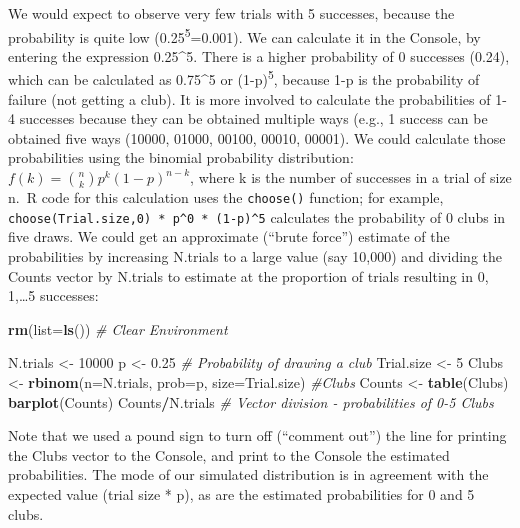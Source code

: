 \documentclass[
]{krantz}
\makeatletter
\newenvironment{Shaded}{\begin{snugshade}}{\end{snugshade}}
\newcommand{\AttributeTok}[1]{\textcolor[rgb]{0.27,0.27,0.27}{#1}}
\newcommand{\CommentTok}[1]{\textcolor[rgb]{0.37,0.37,0.37}{\textit{#1}}}
\newcommand{\DecValTok}[1]{\textcolor[rgb]{0.06,0.06,0.06}{#1}}
\newcommand{\FloatTok}[1]{\textcolor[rgb]{0.06,0.06,0.06}{#1}}
\newcommand{\FunctionTok}[1]{\textcolor[rgb]{0.27,0.27,0.27}{\textbf{#1}}}
\newcommand{\NormalTok}[1]{#1}
\newcommand{\OtherTok}[1]{\textcolor[rgb]{0.37,0.37,0.37}{#1}}
\newcommand{\SpecialCharTok}[1]{\textcolor[rgb]{0.43,0.43,0.43}{\textbf{#1}}}
\newenvironment{kframe}{%
\medskip{}
\setlength{\fboxsep}{.8em}
 \def\at@end@of@kframe{}%
 \ifinner\ifhmode%
  \def\at@end@of@kframe{\end{minipage}}%
  \begin{minipage}{\columnwidth}%
 \fi\fi%
 \def\FrameCommand##1{\hskip\@totalleftmargin \hskip-\fboxsep
 \colorbox{shadecolor}{##1}\hskip-\fboxsep
     \hskip-\linewidth \hskip-\@totalleftmargin \hskip\columnwidth}%
 \MakeFramed {\advance\hsize-\width
   \@totalleftmargin\z@ \linewidth\hsize
   \@setminipage}}%
 {\par\unskip\endMakeFramed%
 \at@end@of@kframe}
\renewenvironment{Shaded}{\begin{kframe}}{\end{kframe}}
\makeatother
\begin{document}
We would expect to observe very few trials with 5 successes, because the probability is quite low (0.25\textsuperscript{5}=0.001). We can calculate it in the Console, by entering the expression 0.25\^{}5. There is a higher probability of 0 successes (0.24), which can be calculated as 0.75\^{}5 or (1-p)\textsuperscript{5}, because 1-p is the probability of failure (not getting a club). It is more involved to calculate the probabilities of 1-4 successes because they can be obtained multiple ways (e.g., 1 success can be obtained five ways (10000, 01000, 00100, 00010, 00001). We could calculate those probabilities using the binomial probability distribution: \(f(k) = {n \choose k} p^{k} (1-p)^{n-k}\), where k is the number of successes in a trial of size n.~R code for this calculation uses the \texttt{choose()} function; for example, \texttt{choose(Trial.size,0)\ *\ p\^{}0\ *\ (1-p)\^{}5} calculates the probability of 0 clubs in five draws. We could get an approximate (``brute force'') estimate of the probabilities by increasing N.trials to a large value (say 10,000) and dividing the Counts vector by N.trials to estimate at the proportion of trials resulting in 0, 1,\ldots5 successes:

\begin{Shaded}
\begin{Highlighting}[]
\FunctionTok{rm}\NormalTok{(}\AttributeTok{list=}\FunctionTok{ls}\NormalTok{()) }\CommentTok{\# Clear Environment}

\NormalTok{N.trials }\OtherTok{\textless{}{-}} \DecValTok{10000}
\NormalTok{p }\OtherTok{\textless{}{-}} \FloatTok{0.25} \CommentTok{\# Probability of drawing a club}
\NormalTok{Trial.size }\OtherTok{\textless{}{-}} \DecValTok{5}
\NormalTok{Clubs }\OtherTok{\textless{}{-}} \FunctionTok{rbinom}\NormalTok{(}\AttributeTok{n=}\NormalTok{N.trials, }\AttributeTok{prob=}\NormalTok{p, }\AttributeTok{size=}\NormalTok{Trial.size)}
\CommentTok{\#Clubs}
\NormalTok{Counts }\OtherTok{\textless{}{-}} \FunctionTok{table}\NormalTok{(Clubs)}
\FunctionTok{barplot}\NormalTok{(Counts)}
\NormalTok{Counts}\SpecialCharTok{/}\NormalTok{N.trials }\CommentTok{\# Vector division {-} probabilities of 0{-}5 Clubs}
\end{Highlighting}
\end{Shaded}

Note that we used a pound sign to turn off (``comment out'') the line for printing the Clubs vector to the Console, and print to the Console the estimated probabilities. The mode of our simulated distribution is in agreement with the expected value (trial size * p), as are the estimated probabilities for 0 and 5 clubs.
\end{document}

